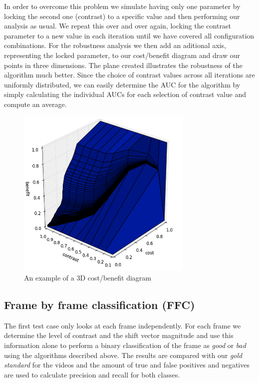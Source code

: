 %
%
%
%
In order to overcome this problem we simulate having only one parameter by locking the second one (contrast) to a specific value and then performing our analysis as usual. We repeat this over and over again, locking the contrast parameter to a new value in each iteration until we have covered all configuration combinations. For the robustness analysis we then add an aditional axis, representing the locked parameter, to our cost/benefit diagram and draw our points in three dimensions. The plane created illustrates the robustness of the algorithm much better. Since the choice of contrast values across all iterations are uniformly distributed, we can easily determine the AUC for the algorithm by simply calculating the individual AUCs for each selection of contrast value and compute an average.
%
\begin{figure}
     \centering
     \includegraphics[width=0.75\textwidth]{img/3dcostbenefitexample.jpg}
     \caption{An example of a 3D cost/benefit diagram}
\end{figure}
%
%
\subsection{Frame by frame classification (FFC)}\label{sec:fbfclass}
%
The first test case only looks at each frame independently. For each frame we determine the level of contrast and the shift vector magnitude and use this information alone to perform a binary classification of the frame as \textit{good} or \textit{bad} using the algorithms described above. The results are compared with our \textit{gold standard} for the videos and the amount of true and false positives and negatives are used to calculate precision and recall for both classes.
%
